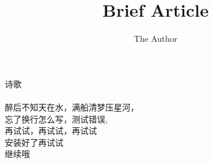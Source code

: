 \documentclass[12pt]{article}
\title{Brief Article}
\author{The Author}
\begin{document}
\maketitle 诗歌
\paragraph{}
醉后不知天在水，满船清梦压星河，\\
忘了换行怎么写，测试错误,\\
再试试，再试试，再试试\\
安装好了再试试\\
继续哦
\end{document}
